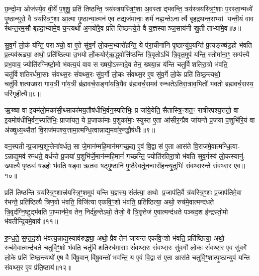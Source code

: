 छ॒न्दो॒मा ओज॑स्ये॒व वी॒र्ये॑ प॒शुषु॒ प्रति॑ तिष्ठन्ति॒ त्रय॑स्त्रयस्त्रि॒ꣳ॒शा अ॒वस्ताद्भवन्ति॒ त्रय॑स्त्रयस्त्रि॒ꣳ॒शाः प॒रस्ता॒न्मध्ये॑ पृ॒ष्ठान्युरो॒ वै त्र॑यस्त्रि॒ꣳ॒शा आ॒त्मा पृ॒ष्ठान्या॒त्मन॑ ए॒व तद्यज॑मानाः॒ शर्म॑ नह्य॒न्तेऽनार्त्यै बृहद्रथन्त॒राभ्यां यन्ती॒यं वाव र॑थन्त॒रम॒सौ बृ॒हदा॒भ्यामे॒व य॒न्त्यथो॑ अ॒नयो॑रे॒व प्रति॑ तिष्ठन्त्ये॒ते वै य॒ज्ञस्याञ्ज॒साय॑नी स्रु॒ती ताभ्या॑मे॒व॥७॥

सु॒व॒र्गं लो॒कं य॑न्ति॒ पराञ्चो॒ वा ए॒ते सु॑व॒र्गं लो॒कम॒भ्यारो॑हन्ति॒ ये प॑रा॒चीना॑नि पृ॒ष्ठान्यु॑प॒यन्ति॑ प्र॒त्यङ्ख्ष॑ड॒हो भ॑वति प्र॒त्यव॑रूढ्या॒ अथो॒ प्रति॑ष्ठित्या उ॒भयोर्लो॒कयोर्\mbox{}॑ऋ॒द्ध्वोत्ति॑ष्ठन्ति त्रि॒वृतोऽधि॑ त्रि॒वृत॒मुप॑ यन्ति॒ स्तोमा॑ना॒ꣳ॒ सम्प॑त्त्यै प्रभ॒वाय॒ ज्योति॑रग्निष्टो॒मो भ॑वत्य॒यं वाव स ख्षयो॒ऽस्मादे॒व तेन॒ ख्षया॒न्न य॑न्ति चतुर्विशतिरा॒त्रो भ॑वति॒ चतु॑र्विशतिरर्धमा॒साः सं॑वथ्स॒रः सं॑वथ्स॒रः सु॑व॒र्गो लो॒कः सं॑वथ्स॒र ए॒व सु॑व॒र्गे लो॒के प्रति॑ तिष्ठ॒न्त्यथो॒ चतु॑र्विशत्यख्षरा गाय॒त्री गा॑य॒त्री ब्र॑ह्मवर्च॒सङ्गा॑यत्रि॒यैव ब्र॑ह्मवर्च॒समव॑ रुन्धतेऽतिरा॒त्राव॒भितो॑ भवतो ब्रह्मवर्च॒सस्य॒ परि॑गृहीत्यै॥८॥

{\anuvakamend[{म॒नु॒ष्य॑स्य मध्य॒तः प॒शव॒स्ताभ्या॑मे॒व सं॑ वथ्स॒रश्चतु॑र्विशतिश्च॥२॥}]}

ऋ॒ख्षा वा इ॒यम॑लो॒मका॑सी॒थ्साका॑मय॒तौष॑धीभि॒र्वन॒स्पति॑भिः॒ प्र जा॑ये॒येति॒ सैतास्त्रि॒ꣳ॒शत॒ꣳ॒ रात्री॑रपश्य॒त्ततो॒ वा इ॒यमोष॑धीभि॒र्वन॒स्पति॑भिः॒ प्राजा॑यत॒ ये प्र॒जाका॑माः प॒शुका॑माः॒ स्युस्त ए॒ता आ॑सीर॒न्प्रैव जा॑यन्ते प्र॒जया॑ प॒शुभि॑रि॒यं वा अ॑ख्षुध्य॒थ्सैतां वि॒राज॑मपश्य॒त्तामा॒त्मन्धि॒त्वान्नाद्य॒मवा॑रु॒न्द्धौष॑धीः॥९॥

वन॒स्पतीन्प्र॒जाम्प॒शून्तेना॑वर्धत॒ सा जे॒मान॑म्महि॒मान॑मगच्छ॒द्य ए॒वं वि॒द्वास॑ ए॒ता आस॑ते वि॒राज॑मे॒वात्मन्धि॒त्वा- ऽन्नाद्य॒मव॑ रुन्धते॒ वर्ध॑न्ते प्र॒जया॑ प॒शुभि॑र्जे॒मान॑म्महि॒मानं॑ गच्छन्ति॒ ज्योति॑रतिरा॒त्रो भ॑वति सुव॒र्गस्य॑ लो॒कस्यानु॑- ख्यात्यै॒ पृष्ठ्यः॑ षड॒हो भ॑वति॒ षड्वा ऋ॒तवः॒ षट्पृ॒ष्ठानि॑ पृ॒ष्ठैरे॒वर्तून॒न्वारो॑हन्त्यृ॒तुभिः॑ संवथ्स॒रन्ते सं॑वथ्स॒र ए॒व॥१०॥

प्रति॑ तिष्ठन्ति त्रयस्त्रि॒ꣳ॒शात्त्र॑यस्त्रि॒ꣳ॒शमुप॑ यन्ति य॒ज्ञस्य॒ संत॑त्या॒ अथो प्र॒जाप॑ति॒र्वै त्र॑यस्त्रि॒ꣳ॒शः प्र॒जाप॑तिमे॒वा र॑भन्ते॒ प्रति॑ष्ठित्यै त्रिण॒वो भ॑वति॒ विजि॑त्या एकवि॒ꣳ॒शो भ॑वति॒ प्रति॑ष्ठित्या॒ अथो॒ रुच॑मे॒वात्मन्द॑धते त्रि॒वृद॑ग्नि॒ष्टुद्भ॑वति पा॒प्मान॑मे॒व तेन॒ निर्द॑ह॒न्तेऽथो॒ तेजो॒ वै त्रि॒वृत्तेज॑ ए॒वात्मन्द॑धते पञ्चद॒श इ॑न्द्रस्तो॒मो भ॑वतीन्द्रि॒यमे॒वाव॑॥११॥

रु॒न्ध॒ते॒ स॒प्त॒द॒शो भ॑वत्य॒न्नाद्य॒स्याव॑रुद्ध्या॒ अथो॒ प्रैव तेन॑ जायन्त एकवि॒ꣳ॒शो भ॑वति॒ प्रति॑ष्ठित्या॒ अथो॒ रुच॑मे॒वात्मन्द॑धते चतुर्वि॒ꣳ॒शो भ॑वति॒ चतु॑र्विशतिरर्धमा॒साः सं॑वथ्स॒रः सं॑वथ्स॒रः सु॑व॒र्गो लो॒कः सं॑वथ्स॒र ए॒व सु॑व॒र्गे लो॒के प्रति॑ तिष्ठ॒न्त्यथो॑ ए॒ष वै वि॑षू॒वान् वि॑षू॒वन्तो॑ भवन्ति॒ य ए॒वं वि॒द्वास॑ ए॒ता आस॑ते चतुर्वि॒ꣳ॒शात्पृ॒ष्ठान्युप॑ यन्ति संवथ्स॒र ए॒व प्र॑ति॒ष्ठाय॑॥१२॥


